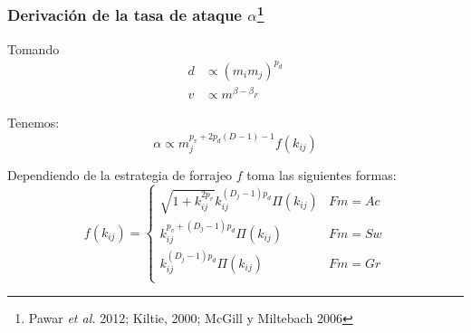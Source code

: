 \documentclass[11 pt,t]{beamer}
\begin{document}
\begin{frame}
  \frametitle{Derivaci\'on de la tasa de ataque $\alpha$\footnote{Pawar \textit{et al.} 2012; Kiltie, 2000; McGill y Miltebach 2006}}
  Tomando
  \begin{equation}
    \begin{aligned}
      d &\propto (m_im_j)^{p_d} \\
      v &\propto m^{\beta - \beta_F}
    \end{aligned}
  \end{equation}

  Tenemos:
  \begin{equation}
    \alpha \propto m_j^{p_v+2p_d(D-1) - 1}f(k_{ij})
  \end{equation}

  Dependiendo de la estrategia de forrajeo $f$ toma las siguientes formas:
  \begin{equation}\label{eq:fkr}
    f(k_{ij}) = 
    \begin{cases}
      \sqrt{1+k_{ij}^{2p_v}}k_{ij}^{(D_j-1)p_d} \Pi(k_{ij}) & Fm = Ac\\
      k_{ij}^{p_v+(D_j-1)p_d}\Pi(k_{ij}) & Fm = Sw\\
      k_{ij}^{(D_j-1)p_d}\Pi(k_{ij}) & Fm = Gr\\
    \end{cases}
  \end{equation}

  
\end{frame}
\end{document}
